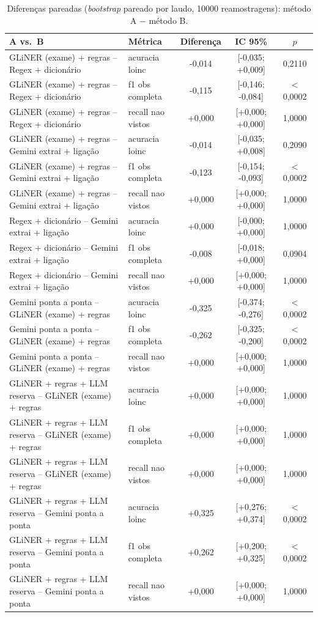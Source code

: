 \begin{table}[ht]\centering\small
\caption{Diferenças pareadas (\textit{bootstrap} pareado por laudo, 10000 reamostragens): método A $-$ método B.}\label{tab:dif}
\begin{tabular}{llccc}\toprule
A vs.\ B & Métrica & Diferença & IC 95\% & $p$\\\midrule
GLiNER (exame) + regras -- Regex + dicionário & acuracia loinc & -0,014 & [-0,035; +0,009] & 0,2110\\
GLiNER (exame) + regras -- Regex + dicionário & f1 obs completa & -0,115 & [-0,146; -0,084] & $<$0,0002\\
GLiNER (exame) + regras -- Regex + dicionário & recall nao vistos & +0,000 & [+0,000; +0,000] & 1,0000\\
GLiNER (exame) + regras -- Gemini extrai + ligação & acuracia loinc & -0,014 & [-0,035; +0,008] & 0,2090\\
GLiNER (exame) + regras -- Gemini extrai + ligação & f1 obs completa & -0,123 & [-0,154; -0,093] & $<$0,0002\\
GLiNER (exame) + regras -- Gemini extrai + ligação & recall nao vistos & +0,000 & [+0,000; +0,000] & 1,0000\\
Regex + dicionário -- Gemini extrai + ligação & acuracia loinc & +0,000 & [-0,000; +0,000] & 1,0000\\
Regex + dicionário -- Gemini extrai + ligação & f1 obs completa & -0,008 & [-0,018; +0,000] & 0,0904\\
Regex + dicionário -- Gemini extrai + ligação & recall nao vistos & +0,000 & [+0,000; +0,000] & 1,0000\\
Gemini ponta a ponta -- GLiNER (exame) + regras & acuracia loinc & -0,325 & [-0,374; -0,276] & $<$0,0002\\
Gemini ponta a ponta -- GLiNER (exame) + regras & f1 obs completa & -0,262 & [-0,325; -0,200] & $<$0,0002\\
Gemini ponta a ponta -- GLiNER (exame) + regras & recall nao vistos & +0,000 & [+0,000; +0,000] & 1,0000\\
GLiNER + regras + LLM reserva -- GLiNER (exame) + regras & acuracia loinc & +0,000 & [+0,000; +0,000] & 1,0000\\
GLiNER + regras + LLM reserva -- GLiNER (exame) + regras & f1 obs completa & +0,000 & [+0,000; +0,000] & 1,0000\\
GLiNER + regras + LLM reserva -- GLiNER (exame) + regras & recall nao vistos & +0,000 & [+0,000; +0,000] & 1,0000\\
GLiNER + regras + LLM reserva -- Gemini ponta a ponta & acuracia loinc & +0,325 & [+0,276; +0,374] & $<$0,0002\\
GLiNER + regras + LLM reserva -- Gemini ponta a ponta & f1 obs completa & +0,262 & [+0,200; +0,325] & $<$0,0002\\
GLiNER + regras + LLM reserva -- Gemini ponta a ponta & recall nao vistos & +0,000 & [+0,000; +0,000] & 1,0000\\
\bottomrule\end{tabular}\end{table}
